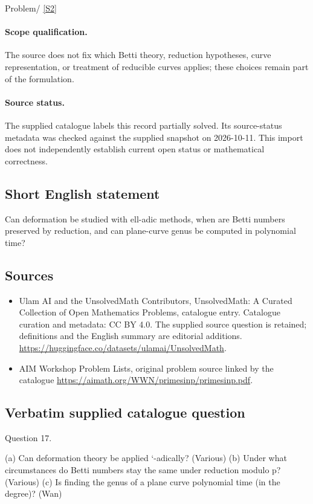 \documentclass[11pt]{article}
\begin{document}
Problem/ \href{https://aimath.org/WWN/primesinp/primesinp.pdf}{[S2]}
\paragraph{Scope qualification.}
The source does not fix which Betti theory, reduction hypotheses, curve representation, or treatment of reducible curves applies; these choices remain part of the formulation.
\paragraph{Source status.}
The supplied catalogue labels this record partially solved. Its source-status metadata was checked against the supplied snapshot on 2026-10-11. This import does not independently establish current open status or mathematical correctness.
\subsection{Short English statement}
Can deformation be studied with ell-adic methods, when are Betti numbers preserved by reduction, and can plane-curve genus be computed in polynomial time?
\subsection{Sources}
\begin{itemize}
\item[S1] Ulam AI and the UnsolvedMath Contributors, UnsolvedMath: A Curated Collection of Open Mathematics Problems, catalogue entry. Catalogue curation and metadata: CC BY 4.0. The supplied source question is retained; definitions and the English summary are editorial additions.
\url{https://huggingface.co/datasets/ulamai/UnsolvedMath}.
\item[S2] AIM Workshop Problem Lists, original problem source linked by the catalogue
\url{https://aimath.org/WWN/primesinp/primesinp.pdf}.
\end{itemize}
\subsection{Verbatim supplied catalogue question}
Question 17.

(a) Can deformation theory be applied `-adically? (Various) (b) Under what circumstances do Betti numbers stay the same under reduction modulo p?(Various) (c) Is finding the genus of a plane curve polynomial time (in the degree)? (Wan)
\end{document}
